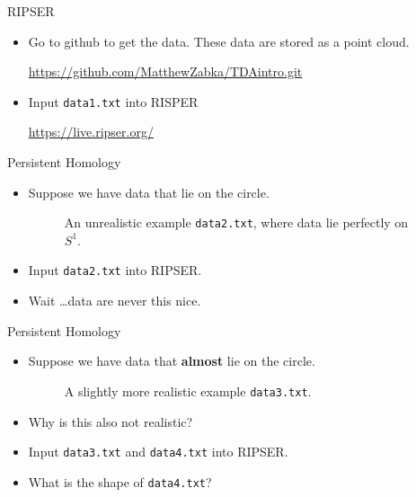 \begin{frame}{RIPSER}
\begin{center}
\end{center}
\begin{itemize}
\item<1-> Go to github to get the data. These data are stored as a point cloud.
\begin{center}
\footnotesize{\url{https://github.com/MatthewZabka/TDAintro.git}}
\end{center}
\item<2-> Input \texttt{data1.txt} into RISPER
\begin{center}
\url{https://live.ripser.org/}
\end{center}
\end{itemize}
\end{frame}
\begin{frame}{Persistent Homology}
\begin{itemize}
\item<1-> Suppose we have data that lie on the circle.
\begin{center}
\begin{figure}
\caption{An unrealistic example \texttt{data2.txt}, where data lie perfectly on $S^1$.}
\end{figure}
\end{center}
\item<2-> Input \texttt{data2.txt} into RIPSER.
\item<2-> Wait \ldots data are never this nice.
\end{itemize}
\end{frame}
\begin{frame}{Persistent Homology}
\begin{itemize}
\item<1-> Suppose we have data that \textbf{almost} lie on the circle.
\begin{center}
\begin{figure}
\caption{A slightly more realistic example \texttt{data3.txt}.}
\end{figure}
\end{center}
\item<2-> Why is this also not realistic?
\item<3-> Input \texttt{data3.txt} and \texttt{data4.txt} into RIPSER.
\item<4-> What is the shape of \texttt{data4.txt}?
\end{itemize}
\end{frame}